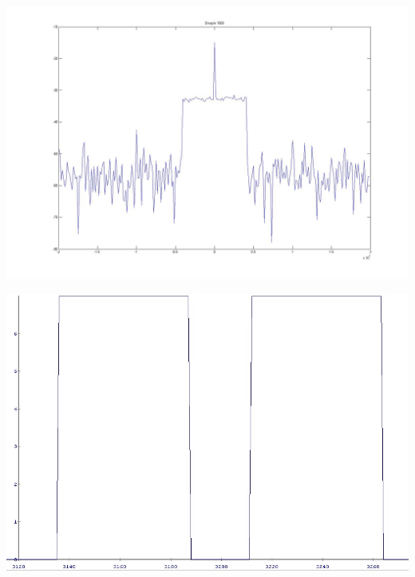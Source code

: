 \begin{center}
\includegraphics[width=\textwidth]{content/fig/Rfbase.JPG}
\label{Rfbase}
\end{center}

\begin{center}
\includegraphics[width=\textwidth]{content/fig/h_mag_chipscope_noChannel.JPG}
\label{h_mag_chipscope_noChannel}
\end{center}

